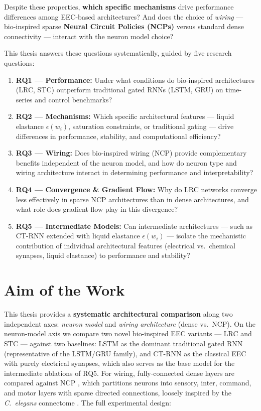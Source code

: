 \documentclass[11pt,a4paper]{article}
\begin{document}
Despite these properties, \textbf{which specific mechanisms} drive performance differences among EEC-based architectures? And does the choice of \emph{wiring} --- bio-inspired sparse \textbf{Neural Circuit Policies (NCPs)} \cite{Lechner_Hasani_Amini_Henzinger_Rus_Grosu_2020} versus standard dense connectivity --- interact with the neuron model choice?

\medskip
\noindent This thesis answers these questions systematically, guided by five research questions:
\begin{enumerate}
    \item \textbf{RQ1 --- Performance:} Under what conditions do bio-inspired architectures (LRC, STC) outperform traditional gated RNNs (LSTM, GRU) on time-series and control benchmarks?
    \item \textbf{RQ2 --- Mechanisms:} Which specific architectural features --- liquid elastance $\epsilon(w_i)$, saturation constraints, or traditional gating --- drive differences in performance, stability, and computational efficiency?
    \item \textbf{RQ3 --- Wiring:} Does bio-inspired wiring (NCP) provide complementary benefits independent of the neuron model, and how do neuron type and wiring architecture interact in determining performance and interpretability?
    \item \textbf{RQ4 --- Convergence \& Gradient Flow:} Why do LRC networks converge less effectively in sparse NCP architectures than in dense architectures, and what role does gradient flow play in this divergence?
    \item \textbf{RQ5 --- Intermediate Models:} Can intermediate architectures --- such as CT-RNN extended with liquid elastance $\epsilon(w_i)$ --- isolate the mechanistic contribution of individual architectural features (electrical vs.\ chemical synapses, liquid elastance) to performance and stability?
\end{enumerate}

\newpage
\section{Aim of the Work}

This thesis provides a \textbf{systematic architectural comparison} along two independent axes: \emph{neuron model} and \emph{wiring architecture} (dense vs.\ NCP). On the neuron-model axis we compare two novel bio-inspired EEC variants --- LRC \cite{Farsang2024liquid} and STC \cite{Farsang2024chemical} --- against two baselines: LSTM \cite{Hochreiter1997} as the dominant traditional gated RNN (representative of the LSTM/GRU family), and CT-RNN as the classical EEC with purely electrical synapses, which also serves as the base model for the intermediate ablations of RQ5. For wiring, fully-connected dense layers are compared against NCP \cite{Lechner_Hasani_Amini_Henzinger_Rus_Grosu_2020}, which partitions neurons into sensory, inter, command, and motor layers with sparse directed connections, loosely inspired by the \textit{C.~elegans} connectome \cite{Wicks1996}. The full experimental design:
\end{document}
